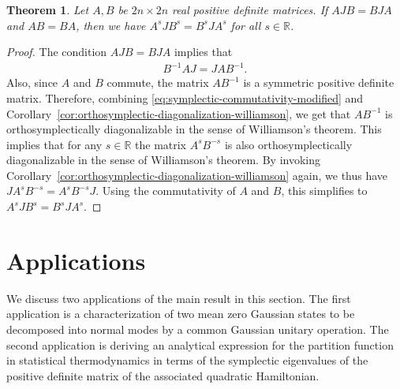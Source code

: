 \documentclass[preprint,12pt]{elsarticle}
\newtheorem{theorem}{Theorem}[section]
\begin{document}
    \begin{theorem}\label{thm:symplectic-commute-powers}
        Let $A, B$ be $2n \times 2n$ real positive definite matrices.
        If $AJB=BJA$ and $AB=BA$, then we have $A^s J B^s= B^s J A^s$ for all $s \in \mathds{R}$.
    \end{theorem}
    \begin{proof}
        The condition $AJB=BJA$ implies that
        \begin{align}\label{eq:symplectic-commutativity-modified}
            B^{-1}AJ=JAB^{-1}.
        \end{align}
        Also, since $A$ and $B$ commute, the matrix $AB^{-1}$ is a symmetric positive definite matrix. 
        Therefore, combining \eqref{eq:symplectic-commutativity-modified} and Corollary~\ref{cor:orthosymplectic-diagonalization-williamson}, we get that $AB^{-1}$ is orthosymplectically diagonalizable in the sense of Williamson's theorem.
        This implies that for any $s \in \mathds{R}$ the matrix $A^sB^{-s}$ is also orthosymplectically diagonalizable in the sense of Williamson's theorem.
        By invoking Corollary~\ref{cor:orthosymplectic-diagonalization-williamson} again, we thus have $JA^sB^{-s}=A^sB^{-s}J$.
        Using the commutativity of $A$ and $B$, this simplifies to $A^s J B^s = B^s J A^s$.
    \end{proof}

    
\section{Applications}
\label{sec:application}

    We discuss two applications of the main result in this section. 
    The first application is a characterization of two mean zero Gaussian states to be decomposed into normal modes by a common Gaussian unitary operation.
    The second application is deriving an analytical expression for the partition function in statistical thermodynamics in terms of the symplectic eigenvalues of the positive definite matrix of the associated quadratic Hamiltonian.
    
    
    
\end{document}
